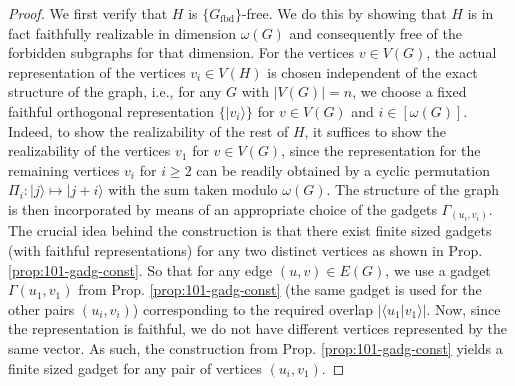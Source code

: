 \documentclass[twocolumn, a4paper, superscriptaddress,nofootinbib, accepted=2020-08-07, hyperref]{quantumarticle}
\begin{document}
\begin{proof}
	We first verify that $H$ is $\{G_{\text{fbd}}\}$-free. We do this by showing that $H$ is in fact faithfully realizable in dimension $\omega(G)$ and consequently free of the forbidden subgraphs for that dimension. For the vertices $v \in V(G)$, the actual representation of the vertices $v_i \in V(H)$ is chosen independent of the exact structure of the graph, i.e., for any $G$ with $|V(G)| = n$, we choose a fixed faithful orthogonal representation $\{|v_i \rangle\}$ for $v \in V(G)$ and $i \in [\omega(G)]$. Indeed, to show the realizability of the rest of $H$, it suffices to show the realizability of the vertices $v_1$ for $v \in V(G)$, since the representation for the remaining vertices $v_i$ for $i \geq 2$ can be readily obtained by a cyclic permutation $\Pi_i: | j \rangle \mapsto | j + i \rangle$ with the sum taken modulo $\omega(G)$. The structure of the graph is then incorporated by means of an appropriate choice of the gadgets $\Gamma_{(u_i,v_i)}$.  The crucial idea behind the construction is that there exist finite sized gadgets (with faithful representations) for any two distinct vertices as shown in Prop. \ref{prop:101-gadg-const}. So that for any edge $(u,v) \in E(G)$, we use a gadget $\Gamma(u_1,v_1)$ from Prop. \ref{prop:101-gadg-const} (the same gadget is used for the other pairs $(u_i,v_i)$) corresponding to the required overlap $|\langle u_1 | v_1 \rangle|$. Now, since the representation is faithful, we do not have different vertices represented by the same vector. As such, the construction from Prop. \ref{prop:101-gadg-const} yields a finite sized gadget for any pair of vertices $(u_i,v_1)$.   
	

\end{proof}
\end{document}
